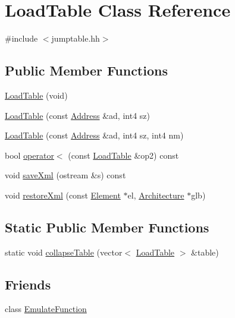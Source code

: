 \hypertarget{class_load_table}{}\section{Load\+Table Class Reference}
\label{class_load_table}


{\ttfamily \#include $<$jumptable.\+hh$>$}

\subsection*{Public Member Functions}
\begin{DoxyCompactItemize}
\item 
\mbox{\hyperlink{class_load_table_a799c6dbf6e0efb106c3af5b6e3dd42cc}{Load\+Table}} (void)
\item 
\mbox{\hyperlink{class_load_table_ab1853a08a32ffe8587514b580218f62d}{Load\+Table}} (const \mbox{\hyperlink{class_address}{Address}} \&ad, int4 sz)
\item 
\mbox{\hyperlink{class_load_table_a24244df0afb9f3426100031ddca944dd}{Load\+Table}} (const \mbox{\hyperlink{class_address}{Address}} \&ad, int4 sz, int4 nm)
\item 
bool \mbox{\hyperlink{class_load_table_a857a77b6381435b9cbff1cb080c9ae6d}{operator$<$}} (const \mbox{\hyperlink{class_load_table}{Load\+Table}} \&op2) const
\item 
void \mbox{\hyperlink{class_load_table_a043aa8df51613f233226f8633aff14eb}{save\+Xml}} (ostream \&s) const
\item 
void \mbox{\hyperlink{class_load_table_a4db003d9f9ded3dce940fa9644b5874d}{restore\+Xml}} (const \mbox{\hyperlink{class_element}{Element}} $\ast$el, \mbox{\hyperlink{class_architecture}{Architecture}} $\ast$glb)
\end{DoxyCompactItemize}
\subsection*{Static Public Member Functions}
\begin{DoxyCompactItemize}
\item 
static void \mbox{\hyperlink{class_load_table_a97a6c0e7bdf847535b4117aff4e49ede}{collapse\+Table}} (vector$<$ \mbox{\hyperlink{class_load_table}{Load\+Table}} $>$ \&table)
\end{DoxyCompactItemize}
\subsection*{Friends}
\begin{DoxyCompactItemize}
\item 
class \mbox{\hyperlink{class_load_table_adea2d7205b5e5454261b8f8e9ff91d81}{Emulate\+Function}}
\end{DoxyCompactItemize}


